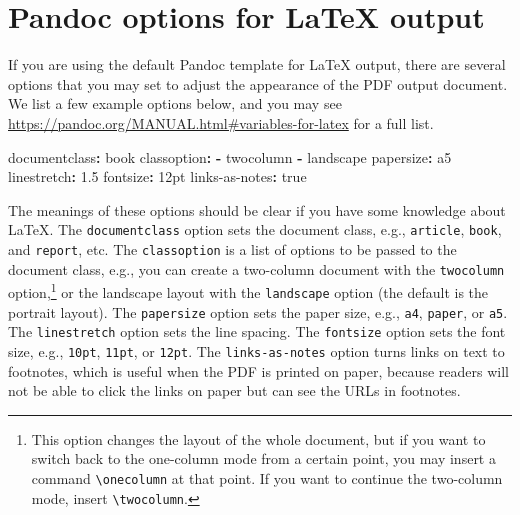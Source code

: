 \documentclass[
  11pt,
]{krantz}
\newenvironment{Shaded}{\begin{snugshade}}{\end{snugshade}}
\newcommand{\AttributeTok}[1]{\textcolor[rgb]{0.61,0.61,0.61}{#1}}
\newcommand{\CharTok}[1]{\textcolor[rgb]{0.5,0.5,0.5}{#1}}
\newcommand{\FloatTok}[1]{\textcolor[rgb]{0.06,0.06,0.06}{#1}}
\newcommand{\FunctionTok}[1]{\textcolor[rgb]{0,0,0}{#1}}
\newcommand{\KeywordTok}[1]{\textcolor[rgb]{0.27,0.27,0.27}{\textbf{#1}}}
\begin{document}
\hypertarget{latex-variables}{%
\section{Pandoc options for LaTeX output}\label{latex-variables}}

If you are using the default Pandoc template for LaTeX output, there are several options that you may set to adjust the appearance of the PDF output document. We list a few example options below, and you may see \url{https://pandoc.org/MANUAL.html\#variables-for-latex} for a full list.

\begin{Shaded}
\begin{Highlighting}[]
\FunctionTok{documentclass}\KeywordTok{:}\AttributeTok{ book}
\FunctionTok{classoption}\KeywordTok{:}
\AttributeTok{  }\KeywordTok{-}\AttributeTok{ twocolumn}
\AttributeTok{  }\KeywordTok{-}\AttributeTok{ landscape}
\FunctionTok{papersize}\KeywordTok{:}\AttributeTok{ a5}
\FunctionTok{linestretch}\KeywordTok{:}\AttributeTok{ }\FloatTok{1.5}
\FunctionTok{fontsize}\KeywordTok{:}\AttributeTok{ 12pt}
\FunctionTok{links-as-notes}\KeywordTok{:}\AttributeTok{ }\CharTok{true}
\end{Highlighting}
\end{Shaded}

The meanings of these options should be clear if you have some knowledge about LaTeX. The \texttt{documentclass} option sets the document class, e.g., \texttt{article}, \texttt{book}, and \texttt{report}, etc. The \texttt{classoption} is a list of options to be passed to the document class, e.g., you can create a two-column document with the \texttt{twocolumn} option,\footnote{This option changes the layout of the whole document, but if you want to switch back to the one-column mode from a certain point, you may insert a command \texttt{\textbackslash{}onecolumn} at that point. If you want to continue the two-column mode, insert \texttt{\textbackslash{}twocolumn}.} or the landscape layout with the \texttt{landscape} option (the default is the portrait layout). The \texttt{papersize} option sets the paper size, e.g., \texttt{a4}, \texttt{paper}, or \texttt{a5}. The \texttt{linestretch} option sets the line spacing. The \texttt{fontsize} option sets the font size, e.g., \texttt{10pt}, \texttt{11pt}, or \texttt{12pt}. The \texttt{links-as-notes} option turns links on text to footnotes, which is useful when the PDF is printed on paper, because readers will not be able to click the links on paper but can see the URLs in footnotes.
\end{document}
